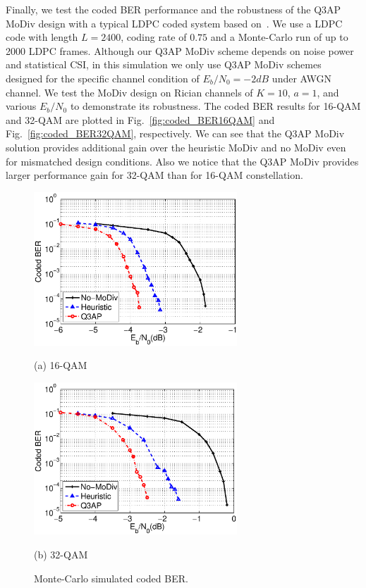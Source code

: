 \documentclass[journal,draftcls,onecolumn,12pt,twoside]{IEEEtran}
\begin{document}
Finally, we test the coded BER performance and the robustness of the Q3AP MoDiv
design with a typical LDPC coded system based on~\cite{hochwald2003achieving}.
We use a LDPC code with length $L=2400$, coding rate of $0.75$ and a
Monte-Carlo run of up to 2000 LDPC frames. Although our Q3AP MoDiv scheme
depends on noise power and statistical CSI, in this simulation we only use Q3AP
MoDiv schemes designed for the specific channel condition of $E_b/N_0=-2dB$
under AWGN channel.
We test the MoDiv design on Rician channels of $K=10$, $a=1$, and various
$E_b/N_0$ to demonstrate its robustness. The coded BER results for 16-QAM and
32-QAM are plotted in Fig.~\ref{fig:coded_BER16QAM} and
Fig.~\ref{fig:coded_BER32QAM}, respectively. We can see that the Q3AP MoDiv
solution provides additional gain over the heuristic MoDiv and no MoDiv even for
mismatched design conditions. Also we notice that the Q3AP MoDiv provides larger
performance gain for 32-QAM than for 16-QAM constellation.

\begin{figure}[!t]
    \begin{minipage}[b]{0.49\linewidth}
      \centering
      \centerline{\includegraphics[width=3.0in]{./figs/coded_BER16QAM.eps}}
      \centerline{(a) 16-QAM}\medskip
    \end{minipage}
    \hfill
    \begin{minipage}[b]{0.49\linewidth}
      \centering
      \centerline{\includegraphics[width=3.0in]{./figs/coded_BER32QAM.eps}}
      \centerline{(b) 32-QAM}\medskip
    \end{minipage}
    \caption{Monte-Carlo simulated coded BER.}
    \label{fig:coded_BER}
\end{figure}
\end{document}
